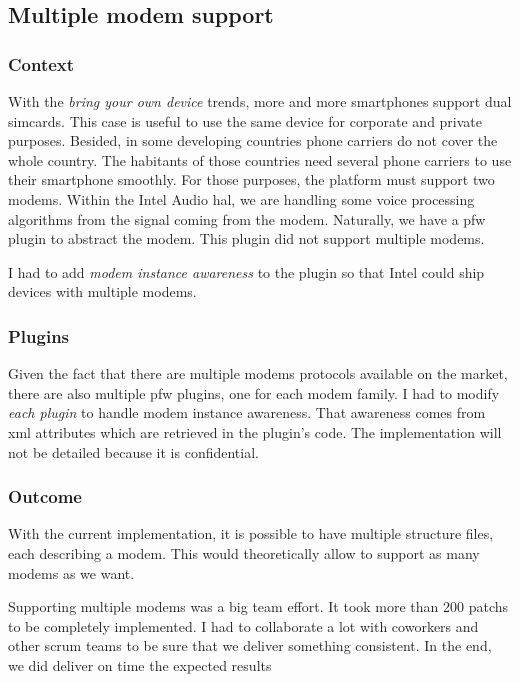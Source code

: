 \subsection{Multiple modem support}
\subsubsection{Context}
With the \emph{bring your own device} trends, more and more smartphones support dual simcards. This case
is useful to use the same device for corporate and private purposes.
Besided, in some developing countries phone carriers do not cover the whole country. The habitants of those
countries need several phone carriers to use their smartphone smoothly.
For those purposes, the platform must support two modems.
Within the Intel Audio \gls{hal}, we are handling some voice processing algorithms from the signal coming from the modem.
Naturally, we have a \gls{pfw} plugin to abstract the modem. This plugin did not support multiple modems.

I had to add \emph{modem instance awareness} to the plugin so that Intel could ship devices with multiple modems.

\subsubsection{Plugins}
Given the fact that there are multiple modems protocols available on the market, there are also multiple \gls{pfw} plugins,
one for each modem family.
I had to modify \emph{each plugin} to handle modem instance awareness. That awareness comes from \gls{xml} attributes which are
retrieved in the plugin's code.
The implementation will not be detailed because it is confidential.

\subsubsection{Outcome}

With the current implementation, it is possible to have multiple structure files, each describing a modem. This would theoretically allow
to support as many modems as we want.

Supporting multiple modems was a big team effort. It took more than 200 patchs to be completely implemented.
I had to collaborate a lot with coworkers and other \gls{scrum} teams to be sure that we deliver something consistent.
In the end, we did deliver on time the expected results



